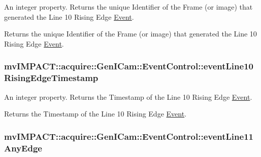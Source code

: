 An integer property. Returns the unique Identifier of the Frame (or image) that generated the Line 10 Rising Edge \hyperlink{classmv_i_m_p_a_c_t_1_1acquire_1_1_event}{Event}. 

Returns the unique Identifier of the Frame (or image) that generated the Line 10 Rising Edge \hyperlink{classmv_i_m_p_a_c_t_1_1acquire_1_1_event}{Event}. \hypertarget{classmv_i_m_p_a_c_t_1_1acquire_1_1_gen_i_cam_1_1_event_control_afef9e4d3c7065173284a4e3d5f9a2bb1}{
\subsubsection[{event\+Line10\+Rising\+Edge\+Timestamp}]{ mv\+I\+M\+P\+A\+C\+T\+::acquire\+::\+Gen\+I\+Cam\+::\+Event\+Control\+::event\+Line10\+Rising\+Edge\+Timestamp}}\label{classmv_i_m_p_a_c_t_1_1acquire_1_1_gen_i_cam_1_1_event_control_afef9e4d3c7065173284a4e3d5f9a2bb1}


An integer property. Returns the Timestamp of the Line 10 Rising Edge \hyperlink{classmv_i_m_p_a_c_t_1_1acquire_1_1_event}{Event}. 

Returns the Timestamp of the Line 10 Rising Edge \hyperlink{classmv_i_m_p_a_c_t_1_1acquire_1_1_event}{Event}. \hypertarget{classmv_i_m_p_a_c_t_1_1acquire_1_1_gen_i_cam_1_1_event_control_abfb82ad34bb2d72b786ed479069a69e2}{
\subsubsection[{event\+Line11\+Any\+Edge}]{ mv\+I\+M\+P\+A\+C\+T\+::acquire\+::\+Gen\+I\+Cam\+::\+Event\+Control\+::event\+Line11\+Any\+Edge}}\label{classmv_i_m_p_a_c_t_1_1acquire_1_1_gen_i_cam_1_1_event_control_abfb82ad34bb2d72b786ed479069a69e2}


